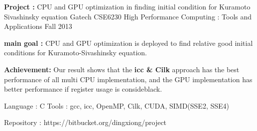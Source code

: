 \begin{cventries}
\cvproject
{\textbf{Project :} CPU and GPU optimization in finding initial 
  condition for Kuramoto Sivashinsky equation} 
{Gatech CSE6230 High Performance Computing : Tools and Applications} 
{Fall 2013} %
{
  \begin{cvitems}
  \item {\textbf{main goal :} CPU and GPU optimization is deployed to find relative 
      good initial conditions for Kuramoto-Sivashinsky equation. 
    }
    \item {\textbf{Achievement: }Our result shows that the 
      \textbf{icc \& Cilk} approach has the best performance of all multi CPU implementation, and
      the GPU implementation has better performance if register usage is consideblack.
    }
  \item {Language : C \quad 
      Tools :  gcc, icc, OpenMP, Cilk, CUDA, SIMD(SSE2, SSE4)
    }
  \item {
      Repository : {\color{black} https://bitbucket.org/dingxiong/project}
    }
  \end{cvitems}
}







\end{cventries}